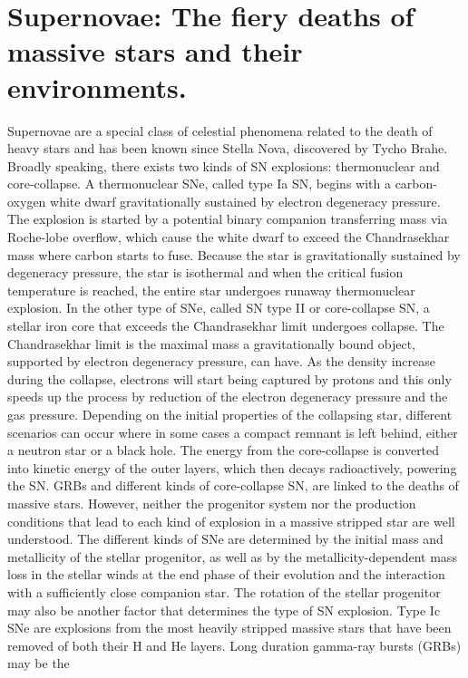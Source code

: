 \section{Supernovae: The fiery deaths of massive stars and their environments.}
\label{sec:intro:sn}
Supernovae are a special class of celestial phenomena related to the death of
heavy stars and has been known since Stella Nova, discovered by Tycho Brahe.
Broadly speaking,
there exists two kinds of SN explosions: thermonuclear and
core-collapse. A
thermonuclear SNe, called type Ia SN, begins with a
carbon-oxygen white dwarf
 gravitationally sustained by electron degeneracy
pressure. The explosion is
started by a potential binary companion transferring
mass via Roche-lobe
overflow, which cause the white dwarf to exceed the
Chandrasekhar mass where
carbon starts to fuse. Because the star is
gravitationally sustained by
degeneracy pressure, the star is isothermal and
when the critical fusion
temperature is reached, the entire star undergoes
runaway thermonuclear
explosion. In the other type of SNe, called SN type II or
core-collapse SN, a
stellar iron core that exceeds the Chandrasekhar limit
undergoes collapse. The Chandrasekhar limit is the maximal mass a
gravitationally bound object, supported by electron degeneracy pressure, can
have. As the density increase during the collapse, electrons will start
being
captured by protons and this only speeds up the process by reduction of the
electron degeneracy pressure and the gas pressure. Depending on the initial
properties
of the collapsing star, different scenarios can occur where in some
cases a
compact remnant is left behind, either a neutron star or a black hole.
The
energy from the core-collapse is converted into kinetic energy of the outer
layers, which then decays radioactively, powering the SN.
GRBs and different
kinds of core-collapse SN, are linked to the
deaths of massive stars. However,
neither the progenitor system nor
  the production conditions that lead to each
kind of explosion in a
  massive stripped star are well understood. The
different kinds of
  SNe are determined by the initial mass and metallicity
of
the stellar progenitor, as well as by the metallicity-dependent
mass loss in the
stellar winds at the end phase of their evolution
and the interaction with a
sufficiently close companion star. The rotation of the stellar progenitor may
also be another factor that determines the type of SN explosion. Type Ic SNe are
explosions from the most heavily stripped
  massive stars that have been removed
of both their H and He layers. Long duration gamma-ray bursts (GRBs) may be the
